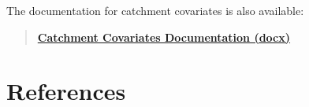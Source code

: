 \documentclass[]{book}
\begin{document}
The documentation for catchment covariates is also available:

\begin{quote}
\textbf{\href{https://ecosheds.org/assets/nhdhrd/v2/NHDHRDV2_Covariate_Documentation.xlsx}{Catchment Covariates Documentation (docx)}}
\end{quote}

\hypertarget{references}{%
\chapter*{References}\label{references}}


\end{document}
